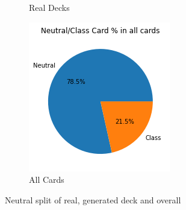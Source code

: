 \documentclass{report} %
\begin{document}
\begin{figure}[H]
\begin{subfigure}{.3\textwidth}
 \caption{Real Decks}
\end{subfigure}%
\begin{subfigure}{.3\textwidth}
 \centering
 \includegraphics[width=.75\linewidth]{TestImages/NeutralSplitAllCards}
 \caption{All Cards}
\end{subfigure}
\caption{Neutral split of real, generated deck and overall}
\end{figure}
\end{document}
